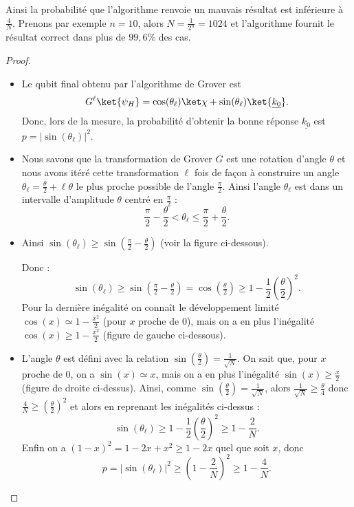 \documentclass[11pt,class=report,crop=false]{standalone}
\begin{document}
Ainsi la probabilité que l'algorithme renvoie un mauvais résultat est inférieure à $\frac4N$.
Prenons par exemple $n=10$, alors $N=\frac{1}{2^n}=1024$ et l'algorithme fournit le résultat correct dans plus de $99,6\%$ des cas.

\begin{proof}
~
\begin{itemize}
  \item Le qubit final obtenu par l'algorithme de Grover est
$$G^\ell\ket{\psi_H} = \cos(\theta_\ell) \ket\chi + \sin(\theta_\ell) \ket{\underline{k_0}}.$$
Donc, lors de la mesure, la probabilité d'obtenir la bonne réponse $\underline{k_0}$ est
$p = |\sin(\theta_\ell)|^2$.

  \item Nous savons que la transformation de Grover $G$ est une rotation d'angle $\theta$ et nous avons itéré cette transformation $\ell$ fois de façon à construire un angle $\theta_\ell = \frac\theta2+\ell\theta$ le plus proche possible de l'angle $\frac\pi2$.
Ainsi l'angle $\theta_\ell$ est dans un intervalle d'amplitude $\theta$ centré en $\frac\pi2$ :
$$\frac\pi2-\frac\theta2 < \theta_\ell \le \frac\pi2+\frac\theta2.$$

  \item Ainsi $\sin(\theta_\ell) \ge \sin \left( \frac\pi2-\frac\theta2 \right)$ (voir la figure ci-dessous).

Donc :
$$\sin(\theta_\ell) 
\ge \sin\left( \tfrac\pi2-\tfrac\theta2 \right)
= \cos\left( \tfrac\theta2 \right)
\ge 1 - \frac12\left(\frac\theta2\right)^2.$$
Pour la dernière inégalité on connaît le développement limité $\cos(x) \simeq 1 - \frac{x^2}{2}$ (pour $x$ proche de $0$), mais on a en plus l'inégalité $\cos(x) \ge 1 - \frac{x^2}{2}$ (figure de gauche ci-dessous).

\medskip


\medskip

  \item L'angle $\theta$ est défini avec la relation $\sin \left( \frac\theta2 \right) = \frac{1}{\sqrt{N}}$.
On sait que, pour $x$ proche de $0$, on a $\sin(x) \simeq x$, mais on a en plus
l'inégalité $\sin(x) \ge \frac x2$ (figure de droite ci-dessus). 
Ainsi, comme $\sin \left(\frac\theta2\right) = \frac{1}{\sqrt{N}}$, alors
$\frac{1}{\sqrt{N}} \ge \frac\theta4$ donc $\frac{4}{N} \ge \left( \frac\theta2 \right)^2$
et alors en reprenant les inégalités ci-dessus :
$$\sin(\theta_\ell) \ge 1 - \frac12\left(\frac\theta2\right)^2
\ge 1-\frac2N.$$
Enfin on a $(1-x)^2 = 1-2x+x^2 \ge 1-2x$ quel que soit $x$, donc
$$p = |\sin(\theta_\ell)|^2 \ge  \left(1-\frac2N\right)^2 \ge 1-\frac4N.$$

\end{itemize}
\end{proof}
\end{document}
